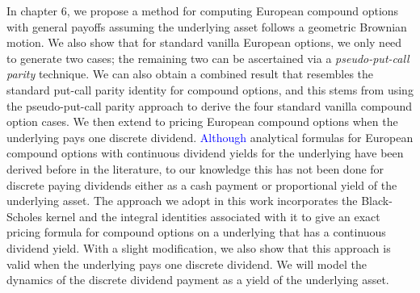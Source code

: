 		In chapter 6, we propose a method for computing European compound options with general payoffs assuming the underlying asset follows a geometric Brownian motion. We also show that for standard vanilla European options, we only need to generate two cases; the remaining two can be ascertained via a \emph{pseudo-put-call parity} technique. We can also obtain a combined result that resembles the standard put-call parity identity for compound options, and this stems from using the pseudo-put-call parity approach to derive the four standard vanilla compound option cases. We then extend to pricing European compound options when the underlying pays one discrete dividend. \textcolor{blue}{Although} analytical formulas for European compound options with continuous dividend yields for the underlying have been derived before in the literature, to our knowledge this has not been done for discrete paying dividends either as a cash payment or proportional yield of the underlying asset. The approach we adopt in this work incorporates the Black-Scholes kernel and the integral identities associated with it to give an exact pricing formula for compound options on a underlying that has a continuous dividend yield. With a slight modification, we also show that this approach is valid when the underlying pays one discrete dividend. We will model the dynamics of the discrete dividend payment as a yield of the underlying asset.
